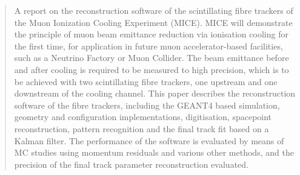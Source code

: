 \begin{quotation}

\noindent
A report on the reconstruction software of the scintillating fibre trackers of the Muon Ionization Cooling Experiment (MICE). MICE will demonstrate the principle of muon beam emittance reduction via ionisation cooling for the first time, for application in future muon accelerator-based facilities, such as a Neutrino Factory or Muon Collider.  The beam emittance before and after cooling is required to be measured to high precision, which is to be achieved with two scintillating fibre trackers, one upstream and one downstream of the cooling channel.  This paper describes the reconstruction software of the fibre trackers, including the GEANT4 based simulation, geometry and configuration implementations, digitisation, spacepoint reconstruction, pattern recognition and the final track fit based on a Kalman filter. The performance of the software is evaluated by means of MC studies using momentum residuals and various other methods, and the precision of the final track parameter reconstruction evaluated.

\end{quotation}
